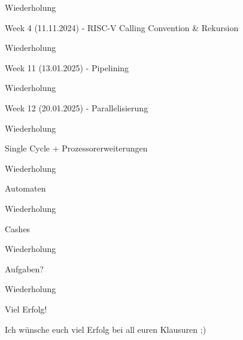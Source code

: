 \documentclass[
  german,            %
  aspectratio=169,    %
]{tumbeamer}
\begin{document}
\begin{frame}[c]{}{}
	\begin{center}
	  \LARGE Wiederholung
	\end{center}
\end{frame}

\begin{frame}[c]{Week 4 (11.11.2024) - RISC-V Calling Convention \& Rekursion}{}
	\begin{center}
	  \LARGE Wiederholung
	\end{center}
\end{frame}

\begin{frame}[c]{Week 11 (13.01.2025) - Pipelining}{}
	\begin{center}
	  \LARGE Wiederholung
	\end{center}
\end{frame}

\begin{frame}[c]{Week 12 (20.01.2025) - Parallelisierung}{}
	\begin{center}
	  \LARGE Wiederholung
	\end{center}
\end{frame}

\begin{frame}[c]{Single Cycle + Prozessorerweiterungen}{}
	\begin{center}
	  \LARGE Wiederholung
	\end{center}
\end{frame}

\begin{frame}[c]{Automaten}{}
	\begin{center}
	  \LARGE Wiederholung
	\end{center}
\end{frame}

\begin{frame}[c]{Cashes}{}
	\begin{center}
	  \LARGE Wiederholung
	\end{center}
\end{frame}

\begin{frame}[c]{Aufgaben?}{}
	\begin{center}
	  \LARGE Wiederholung
	\end{center}
\end{frame}

\begin{frame}[c]{Viel Erfolg!}{}
  \begin{center}
	\LARGE Ich wünsche euch viel Erfolg bei all euren Klausuren ;)
  \end{center}
\end{frame}
\end{document}
